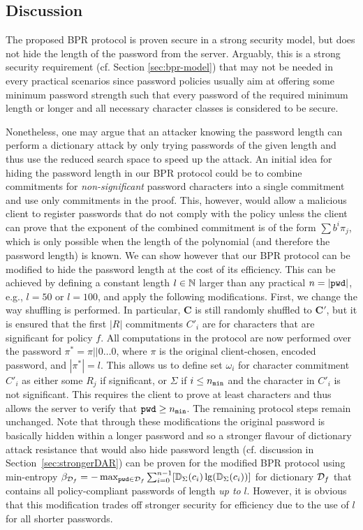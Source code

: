 \subsection{Discussion} \label{sec:bpr-discussion}
The proposed \ac{BPR} protocol is proven secure in a strong security model, but does not hide the length of the password from the server.
Arguably, this is a strong security requirement (cf. Section \ref{sec:bpr-model}) that may not be needed in every practical scenarios since password policies usually aim at offering some minimum password strength such that every password of the required minimum length or longer and all necessary character classes is considered to be secure.

Nonetheless, one may argue that an attacker knowing the password length can perform a dictionary attack by only trying passwords of the given length and thus use the reduced search space to speed up the attack. An initial idea for hiding the password length in our \ac{BPR} protocol could be to combine commitments for \emph{non-significant} password characters into a single commitment and use only \pmin commitments in the proof. This, however, would allow a malicious client to register passwords that do not comply with the policy unless the client can prove that the exponent of the combined commitment is of the form $\sum b^i\pi_j$, which is only possible when the length of the polynomial (and therefore the password length) is known.
We can show however that our \ac{BPR} protocol can be modified to hide the password length at the cost of its efficiency. This can be achieved by defining a constant length $l\in\mathbb{N}$ larger than any practical $n=|\mathtt{pwd}|$, e.g., $l=50$ or $l=100$, and apply the following modifications. First, we change the way shuffling is performed.
In particular, $\bm C$ is still randomly shuffled to $\bm C'$, but it is ensured that the first $|R|$ commitments $C'_i$ are for characters that are significant for policy $f$.
All computations in the protocol are now performed over the password $\pi^\ast=\pi||0\dots 0$, where $\pi$ is the original client-chosen, encoded password, and $|\pi^\ast|=l$.
This allows us to define set $\omega_i$ for character commitment $C'_i$ as either some $R_j$ if significant, or $\Sigma$ if $i\leq{n_\mathtt{min}}$ and the character in $C'_i$ is not significant. %
This requires the client to prove at least \pmin characters and thus allows the server to verify that $\mathtt{pwd}\geq{n_\mathtt{min}}$.
The remaining protocol steps remain unchanged.
Note that through these modifications the original password is basically hidden within a longer password and so a stronger flavour of dictionary attack resistance that would also hide password length (cf. discussion in Section~\ref{sec:strongerDAR}) can be proven for the modified \ac{BPR} protocol using min-entropy
$\beta_{\mathcal{D}_{f}} = -\max_{\mathtt{pwd}\in \mathcal{D}_{f}} \sum_{i=0}^{n-1} [\mathbb{D}_\Sigma(c_i)\lg(\mathbb{D}_\Sigma(c_i))]$
for dictionary $\mathcal{D}_{f}$ that contains all policy-compliant passwords of length \emph{up to} $l$.
However, it is obvious that this modification trades off stronger security for efficiency due to the use of $l$ for all shorter passwords.

